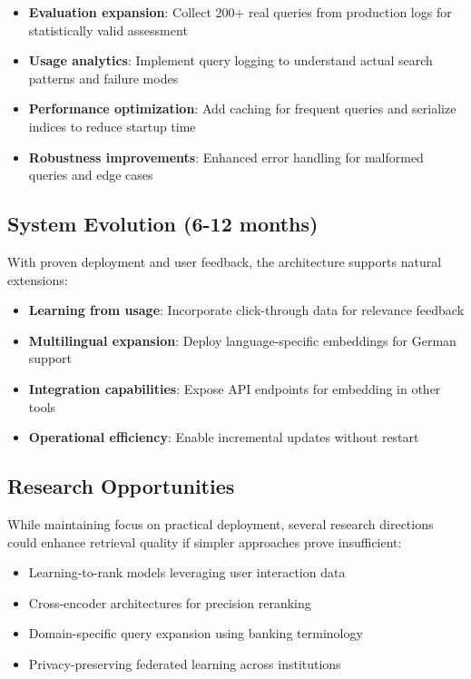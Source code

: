 \begin{itemize}[leftmargin=*,itemsep=2pt,topsep=2pt]
  \item \textbf{Evaluation expansion}: Collect 200+ real queries from production logs for statistically valid assessment
  \item \textbf{Usage analytics}: Implement query logging to understand actual search patterns and failure modes
  \item \textbf{Performance optimization}: Add caching for frequent queries and serialize indices to reduce startup time
  \item \textbf{Robustness improvements}: Enhanced error handling for malformed queries and edge cases
\end{itemize}

\subsection{System Evolution (6-12 months)}

With proven deployment and user feedback, the architecture supports natural extensions:

\begin{itemize}[leftmargin=*,itemsep=2pt,topsep=2pt]
  \item \textbf{Learning from usage}: Incorporate click-through data for relevance feedback
  \item \textbf{Multilingual expansion}: Deploy language-specific embeddings for German support
  \item \textbf{Integration capabilities}: Expose API endpoints for embedding in other tools
  \item \textbf{Operational efficiency}: Enable incremental updates without restart
\end{itemize}

\subsection{Research Opportunities}

While maintaining focus on practical deployment, several research directions could enhance retrieval quality if simpler approaches prove insufficient:

\begin{itemize}[leftmargin=*,itemsep=2pt,topsep=2pt]
  \item Learning-to-rank models leveraging user interaction data
  \item Cross-encoder architectures for precision reranking
  \item Domain-specific query expansion using banking terminology
  \item Privacy-preserving federated learning across institutions
\end{itemize}

